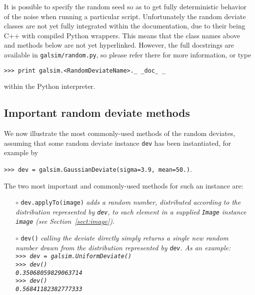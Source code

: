 \documentclass[preprint,11pt]{aastex}
\begin{document}
It is possible to specify the random seed so as to get fully
deterministic behavior of the noise when running a particular script.
Unfortunately the random deviate classes are not yet fully integrated
within the documentation, due to their being C++ with compiled Python
wrappers.  This means that the class names above and methods below are
not yet hyperlinked.  However, the full docstrings are available in
\texttt{galsim/random.py}, so please refer there for more information,
or type

{\tt >>> print galsim.<RandomDeviateName>.\_\,\_doc\_\,\_}

within the Python interpreter.

\subsection{Important random deviate methods}\label{sect:randommethods}
We now illustrate the most commonly-used methods of the random
deviates, assuming that some random deviate instance \texttt{dev} has
been instantiated, for example by

{\tt >>> dev = galsim.GaussianDeviate(sigma=3.9, mean=50.)}.

The two most important and commonly-used methods for such an
instance are:
\begin{itemize}

\item[$\circ$] \texttt{dev.applyTo(image)} \newline \emph{adds a
    random number, distributed according to the distribution
    represented by \texttt{dev}, to each element in a supplied
    \texttt{Image} instance \texttt{image} (see
    Section~\ref{sect:image}).}

\item[$\circ$] \texttt{dev()} \newline \emph{calling the deviate
    directly simply returns a single new random number drawn from the
    distribution
    represented by \texttt{dev}.  As an example:\newline \\
    {\tt >>> dev = galsim.UniformDeviate()}\\
    {\tt >>> dev()} \\
    {\tt 0.35068059829063714} \\
    {\tt >>> dev() }\\
    {\tt 0.56841182382777333}}

\end{itemize}
\end{document}
